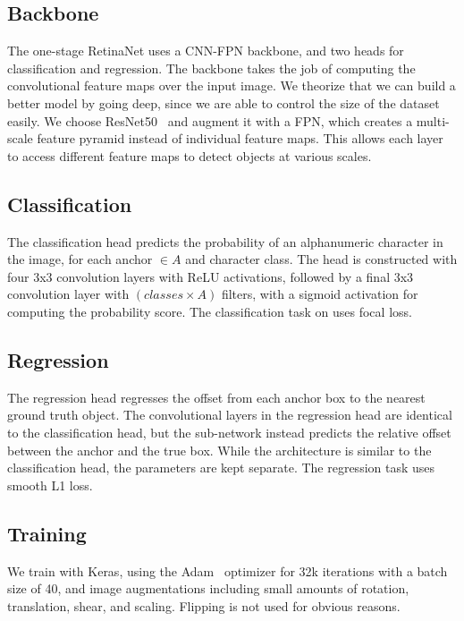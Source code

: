 \documentclass[twocolumn,10pt]{article}
\begin{document}
\subsection{Backbone}
The one-stage RetinaNet uses a CNN-FPN backbone, and two heads for classification and regression. The backbone takes the job of computing the convolutional feature maps over the input image. We theorize that we can build a better model by going deep, since we are able to control the size of the dataset easily. We choose ResNet50~\cite{resnet} and augment it with a FPN, which creates a multi-scale feature pyramid instead of individual feature maps. This allows each layer to access different feature maps to detect objects at various scales.

\subsection{Classification}
The classification head predicts the probability of an alphanumeric character in the image, for each anchor $\in A$ and character class. The head is constructed with four 3x3 convolution layers with ReLU activations, followed by a final 3x3 convolution layer with $(classes \times A)$ filters, with a sigmoid activation for computing the probability score. The classification task on uses focal loss.

\subsection{Regression}
The regression head regresses the offset from each anchor box to the nearest ground truth object. The convolutional layers in the regression head are identical to the classification head, but the sub-network instead predicts the relative offset between the anchor and the true box. While the architecture is similar to the classification head, the parameters are kept separate. The regression task uses smooth L1 loss.

\subsection{Training}
We train with Keras, using the Adam~\cite{adam} optimizer for 32k iterations with a batch size of 40, and image augmentations including small amounts of rotation, translation, shear, and scaling. Flipping is not used for obvious reasons. 
\end{document}
